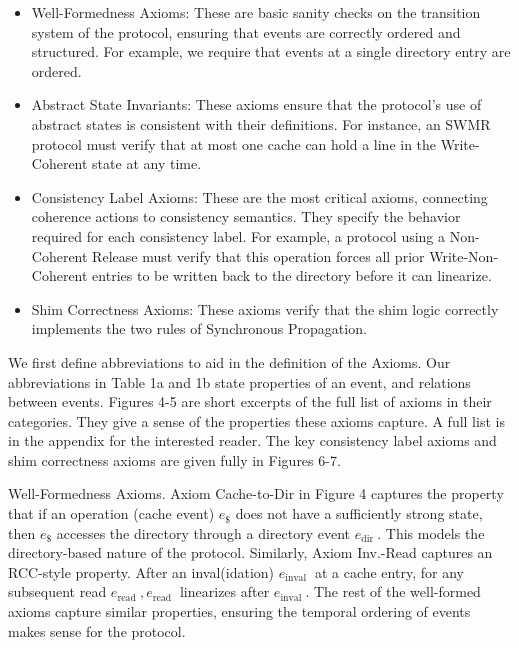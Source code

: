 \documentclass[10pt]{article}
\begin{document}
\begin{itemize}
  \item[-] Well-Formedness Axioms: These are basic sanity checks on the transition system of the protocol, ensuring that events are correctly ordered and structured. For example, we require that events at a single directory entry are ordered.
  \item[-] Abstract State Invariants: These axioms ensure that the protocol's use of abstract states is consistent with their definitions. For instance, an SWMR protocol must verify that at most one cache can hold a line in the Write-Coherent state at any time.
  \item[-] Consistency Label Axioms: These are the most critical axioms, connecting coherence actions to consistency semantics. They specify the behavior required for each consistency label. For example, a protocol using a Non-Coherent Release must verify that this operation forces all prior Write-Non-Coherent entries to be written back to the directory before it can linearize.
\end{itemize}

\begin{itemize}
  \item[-] Shim Correctness Axioms: These axioms verify that the shim logic correctly implements the two rules of Synchronous Propagation.
\end{itemize}

We first define abbreviations to aid in the definition of the Axioms. Our abbreviations in Table 1a and 1b state properties of an event, and relations between events. Figures 4-5 are short excerpts of the full list of axioms in their categories. They give a sense of the properties these axioms capture. A full list is in the appendix for the interested reader. The key consistency label axioms and shim correctness axioms are given fully in Figures 6-7.

Well-Formedness Axioms. Axiom Cache-to-Dir in Figure 4 captures the property that if an operation (cache event) $e_{\$}$ does not have a sufficiently strong state, then $e_{\$}$ accesses the directory through a directory event $e_{\text {dir }}$. This models the directory-based nature of the protocol. Similarly, Axiom Inv.-Read captures an RCC-style property. After an inval(idation) $e_{\text {inval }}$ at a cache entry, for any subsequent read $e_{\text {read }}, e_{\text {read }}$ linearizes after $e_{\text {inval }}$. The rest of the well-formed axioms capture similar properties, ensuring the temporal ordering of events makes sense for the protocol.
\end{document}
